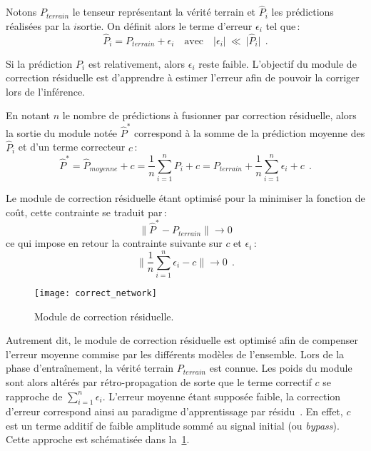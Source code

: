 Notons $P_\mathit{terrain}$ le tenseur représentant la vérité terrain et $\hat{P}_i$ les prédictions réalisées par la $i$\ieme sortie. On définit alors le terme d'erreur $\epsilon_i$ tel que\,:
\begin{equation}
\hat{P}_i = P_\mathit{terrain} + \epsilon_i \text{~~~avec~~~} \lvert \epsilon_i \lvert ~\ll~ \rvert \hat{P}_i \rvert~~.
\end{equation}

Si la prédiction $P_i$ est relativement, alors $\epsilon_i$ reste faible. L'objectif du module de correction résiduelle est d'apprendre à estimer l'erreur afin de pouvoir la corriger lors de l'inférence.

En notant $n$ le nombre de prédictions à fusionner par correction résiduelle, alors la sortie du module notée $\hat{P}^*$ correspond à la somme de la prédiction moyenne des $\hat{P}_i$ et d'un terme correcteur $c$\,:
\begin{equation}
\hat{P}^* = \hat{P}_\mathit{moyenne} + c = \frac{1}{n} \sum_{i=1}^n P_i + c = P_\mathit{terrain} + \frac{1}{n} \sum_{i=1}^n \epsilon_i + c~~.
\end{equation}

Le module de correction résiduelle étant optimisé pour la minimiser la fonction de coût, cette contrainte se traduit par\,:
\begin{equation}
\lVert \hat{P}^* - P_\mathit{terrain} \rVert \rightarrow 0
\end{equation}
ce qui impose en retour la contrainte suivante sur $c$ et $\epsilon_i$\,:
\begin{equation}
\lVert \frac{1}{n} \sum_{i=1}^n \epsilon_i - c \rVert \rightarrow 0~~.
\end{equation}

\begin{figure}[t]
  \centering
  \texttt{[image: correct\_network]}
  \caption{Module de correction résiduelle.}
  \label{fig:correction_network}
\end{figure}

Autrement dit, le module de correction résiduelle est optimisé afin de compenser l'erreur moyenne commise par les différents modèles de l'ensemble. Lors de la phase d'entraînement, la vérité terrain $P_\mathit{terrain}$ est connue. Les poids du module sont alors altérés par rétro-propagation de sorte que le terme correctif $c$ se rapproche de $\sum_{i=1}^n \epsilon_i$. L'erreur moyenne étant supposée faible, la correction d'erreur correspond ainsi au paradigme d'apprentissage par résidu~\cite{he_deep_2016}. En effet, $c$ est un terme additif de faible amplitude sommé au signal initial (ou \emph{bypass}). Cette approche est schématisée dans la~\cref{fig:correction_network}.

